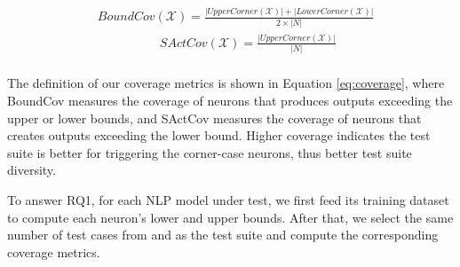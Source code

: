 \begin{equation}
\begin{split}
     & BoundCov(\mathcal{X}) = \frac{|UpperCorner(\mathcal{X})| + |LowerCorner(\mathcal{X})| }{2 \times |N|} \\ 
     &\quad  \qquad \qquad  SActCov(\mathcal{X}) = \frac{|UpperCorner(\mathcal{X})|} {|N|} \\ 
\end{split}
    \label{eq:coverage}
\end{equation}

\noindent The definition of our coverage metrics is shown in Equation \ref{eq:coverage}, where BoundCov measures the coverage of neurons that produces outputs exceeding the upper or lower bounds, and SActCov measures the coverage of neurons that creates outputs exceeding the lower bound.
Higher coverage indicates the test suite is better for triggering the corner-case neurons, thus better test suite diversity.



To answer RQ1, for each NLP model under test, we first feed its training dataset to compute each neuron's lower and upper bounds. After that, we select the same number of test cases from \tool and \Cklst as the test suite and compute the corresponding coverage metrics.


